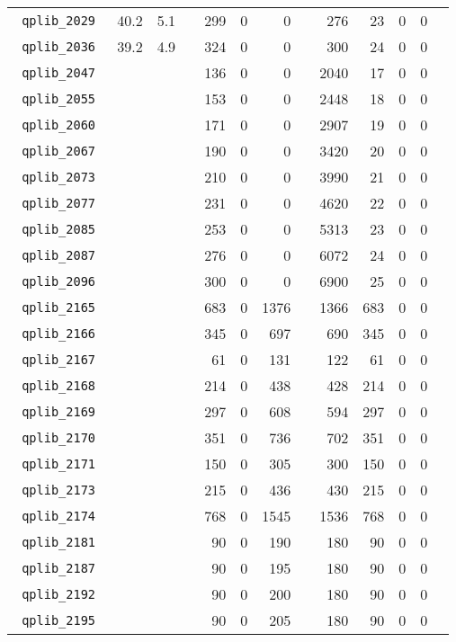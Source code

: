 {\begin{longtable}{lrrrrrrrrrrrr}
\texttt{ 	qplib\_2029	}	&	40.2	&	5.1	&	&	299	&	0	&	0	&	&	276	&	23	&	0	&	0	\\
\texttt{ 	qplib\_2036	}	&	39.2	&	4.9	&	&	324	&	0	&	0	&	&	300	&	24	&	0	&	0	\\
\texttt{ 	qplib\_2047	}	&		&		&	&	136	&	0	&	0	&	&	2040	&	17	&	0	&	0	\\
\texttt{ 	qplib\_2055	}	&		&		&	&	153	&	0	&	0	&	&	2448	&	18	&	0	&	0	\\
\texttt{ 	qplib\_2060	}	&		&		&	&	171	&	0	&	0	&	&	2907	&	19	&	0	&	0	\\
\texttt{ 	qplib\_2067	}	&		&		&	&	190	&	0	&	0	&	&	3420	&	20	&	0	&	0	\\
\texttt{ 	qplib\_2073	}	&		&		&	&	210	&	0	&	0	&	&	3990	&	21	&	0	&	0	\\
\texttt{ 	qplib\_2077	}	&		&		&	&	231	&	0	&	0	&	&	4620	&	22	&	0	&	0	\\
\texttt{ 	qplib\_2085	}	&		&		&	&	253	&	0	&	0	&	&	5313	&	23	&	0	&	0	\\
\texttt{ 	qplib\_2087	}	&		&		&	&	276	&	0	&	0	&	&	6072	&	24	&	0	&	0	\\
\texttt{ 	qplib\_2096	}	&		&		&	&	300	&	0	&	0	&	&	6900	&	25	&	0	&	0	\\
\texttt{ 	qplib\_2165	}	&		&		&	&	683	&	0	&	1376	&	&	1366	&	683	&	0	&	0	\\
\texttt{ 	qplib\_2166	}	&		&		&	&	345	&	0	&	697	&	&	690	&	345	&	0	&	0	\\
\texttt{ 	qplib\_2167	}	&		&		&	&	61	&	0	&	131	&	&	122	&	61	&	0	&	0	\\
\texttt{ 	qplib\_2168	}	&		&		&	&	214	&	0	&	438	&	&	428	&	214	&	0	&	0	\\
\texttt{ 	qplib\_2169	}	&		&		&	&	297	&	0	&	608	&	&	594	&	297	&	0	&	0	\\
\texttt{ 	qplib\_2170	}	&		&		&	&	351	&	0	&	736	&	&	702	&	351	&	0	&	0	\\
\texttt{ 	qplib\_2171	}	&		&		&	&	150	&	0	&	305	&	&	300	&	150	&	0	&	0	\\
\texttt{ 	qplib\_2173	}	&		&		&	&	215	&	0	&	436	&	&	430	&	215	&	0	&	0	\\
\texttt{ 	qplib\_2174	}	&		&		&	&	768	&	0	&	1545	&	&	1536	&	768	&	0	&	0	\\
\texttt{ 	qplib\_2181	}	&		&		&	&	90	&	0	&	190	&	&	180	&	90	&	0	&	0	\\
\texttt{ 	qplib\_2187	}	&		&		&	&	90	&	0	&	195	&	&	180	&	90	&	0	&	0	\\
\texttt{ 	qplib\_2192	}	&		&		&	&	90	&	0	&	200	&	&	180	&	90	&	0	&	0	\\
\texttt{ 	qplib\_2195	}	&		&		&	&	90	&	0	&	205	&	&	180	&	90	&	0	&	0	\\

\end{longtable}}
